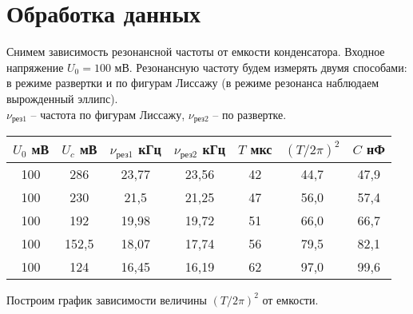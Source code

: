 





    
    
    \section{Обработка данных}
	
	
	Снимем зависимость резонансной частоты от емкости конденсатора. Входное напряжение $U_0 = 100$ мВ. Резонансную частоту будем измерять двумя способами: в режиме развертки и по фигурам Лиссажу (в режиме резонанса наблюдаем вырожденный эллипс).\\
	$\nu_{\text{рез1}}$ -- частота по фигурам Лиссажу, $\nu_{\text{рез2}}$ -- по развертке.
	
	\begin{table}[h!]
		\begin{center}
			\begin{tabular}{|c|c|c|c|c|c|c|}
				\hline
				$U_0$ мВ & $U_c$ мВ & $\nu_{\text{рез1}}$ кГц & $\nu_{\text{рез2}}$ кГц & $T$ мкс & $(T/2 \pi)^2$ & $C$ нФ \\ \hline
				100      & 286      & 23,77                   & 23,56                   & 42      & 44,7          & 47,9   \\ \hline
				100      & 230      & 21,5                    & 21,25                   & 47      & 56,0          & 57,4   \\ \hline
				100      & 192      & 19,98                   & 19,72                   & 51      & 66,0          & 66,7   \\ \hline
				100      & 152,5    & 18,07                   & 17,74                   & 56      & 79,5          & 82,1   \\ \hline
				100      & 124      & 16,45                   & 16,19                   & 62      & 97,0          & 99,6   \\ \hline
			\end{tabular}
		\end{center}
	\end{table}
	
	Построим график зависимости величины $(T/2 \pi)^2$ от емкости.
	
	
